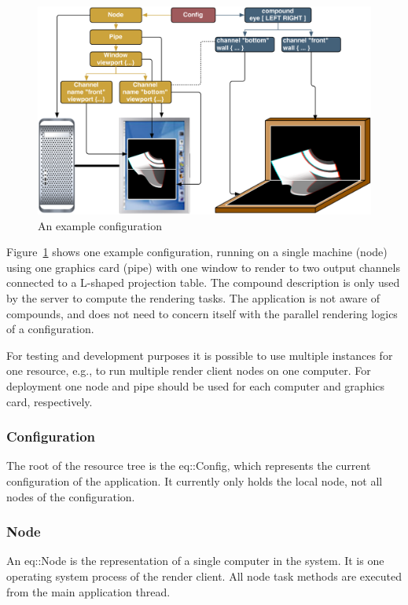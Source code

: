 \documentclass[10pt,a4]{scrartcl}
\newcommand{\fig}[1]{Figure~\ref{#1}}
\begin{document}
\begin{figure}[ht]
  \centering
  \includegraphics[width=\columnwidth]{desk.pdf}{\caption{\label{fConfig}An
      example configuration}}
\end{figure}

\fig{fConfig} shows one example configuration, running on a single
machine (node) using one graphics card (pipe) with one window to render
to two output channels connected to a L-shaped projection table. The
compound description is only used by the server to compute the rendering
tasks. The application is not aware of compounds, and does not need to
concern itself with the parallel rendering logics of a configuration.

For testing and development purposes it is possible to use multiple
instances for one resource, e.g., to run multiple render client nodes on
one computer. For deployment one node and pipe should be used for each
computer and graphics card, respectively.

\subsubsection{Configuration}

The root of the resource tree is the \textsf{eq::Config}, which
represents the current configuration of the application. It currently
only holds the local node, not all nodes of the configuration.

\subsubsection{Node}

An \textsf{eq::Node} is the representation of a single computer in the
system. It is one operating system process of the render client. All
node task methods are executed from the main application thread.
\end{document}
